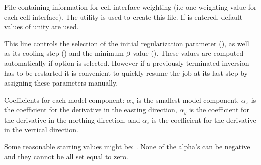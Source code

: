 \begin{description}[leftmargin=5cm, style=sameline, align=left]
\item[\fileName{interface weighting}] File containing information for cell interface weighting (i.e one weighting value for each cell interface). The utility  is used to create this  file. If  is entered, default values of unity are used.      
\item[\codeName{beta}] This line controls the selection of the initial regularization parameter (), as well as its cooling step () and the minimum $\beta$ value (). These values are computed automatically if  option is selected. However if a previously terminated inversion has to be restarted it is convenient to quickly resume the job at its last step by assigning these parameters manually.
\item [\fileName{$\alpha_s, \alpha_x, \alpha_y, \alpha_z$}] Coefficients for each model component: $\alpha_s$ is the smallest model component, $\alpha_x$ is the coefficient for the derivative in the easting direction, $\alpha_y$ is the coefficient for the derivative in the northing direction, and $\alpha_z$ is the coefficient for the derivative in the vertical direction.

Some reasonable starting values might be: . None of the alpha's can be negative and they cannot be all set equal to zero.


\end{description}
